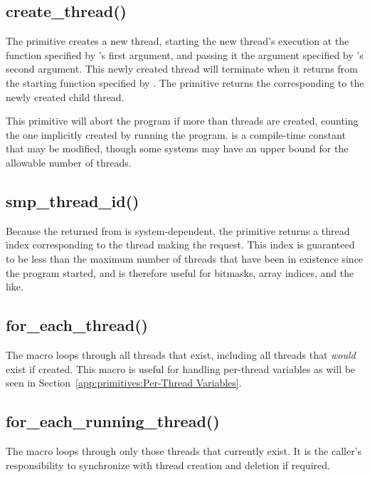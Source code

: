 \subsection{create\_thread()}

The  primitive creates a new thread,
starting the new thread's execution
at the function  specified by 's
first argument, and passing it the argument specified by
's second argument.
This newly created thread will terminate when it returns from the
starting function specified by .
The  primitive returns the 
corresponding to the newly created child thread.

This primitive will abort the program if more than 
threads are created, counting the one implicitly created by running
the program.
 is a compile-time constant that may be modified,
though some systems may have an upper bound for the allowable number
of threads.

\subsection{smp\_thread\_id()}

Because the  returned from  is
system-dependent, the  primitive returns a thread
index corresponding to the thread making the request.
This index is guaranteed to be less than the maximum number of threads
that have been in existence since the program started,
and is therefore useful for bitmasks, array indices, and
the like.

\subsection{for\_each\_thread()}

The  macro loops through all threads that exist,
including all threads that \emph{would} exist if created.
This macro is useful for handling per-thread variables as will be
seen in Section~\ref{app:primitives:Per-Thread Variables}.

\subsection{for\_each\_running\_thread()}

The 
macro loops through only those threads that currently exist.
It is the caller's responsibility to synchronize with thread
creation and deletion if required.

